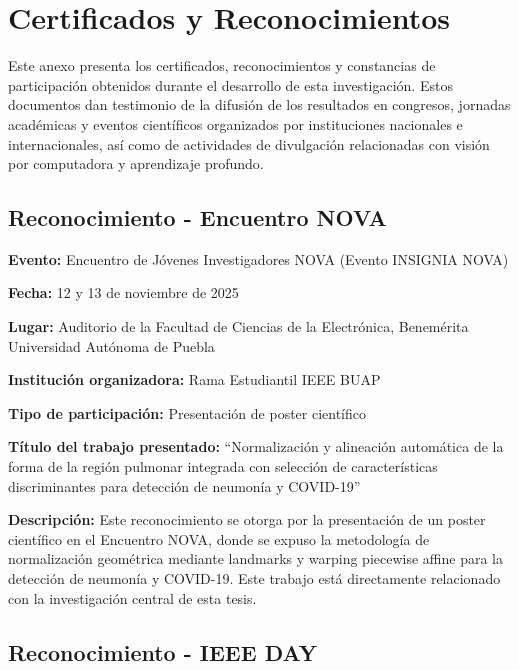 \chapter{Certificados y Reconocimientos}
\label{anexo:certificados}

Este anexo presenta los certificados, reconocimientos y constancias de participación obtenidos durante el desarrollo de esta investigación. Estos documentos dan testimonio de la difusión de los resultados en congresos, jornadas académicas y eventos científicos organizados por instituciones nacionales e internacionales, así como de actividades de divulgación relacionadas con visión por computadora y aprendizaje profundo.

\section{Reconocimiento - Encuentro NOVA}

\textbf{Evento:} Encuentro de Jóvenes Investigadores NOVA (Evento INSIGNIA NOVA)

\textbf{Fecha:} 12 y 13 de noviembre de 2025

\textbf{Lugar:} Auditorio de la Facultad de Ciencias de la Electrónica, Benemérita Universidad Autónoma de Puebla

\textbf{Institución organizadora:} Rama Estudiantil IEEE BUAP

\textbf{Tipo de participación:} Presentación de poster científico

\textbf{Título del trabajo presentado:} ``Normalización y alineación automática de la forma de la región pulmonar integrada con selección de características discriminantes para detección de neumonía y COVID-19''

\textbf{Descripción:} Este reconocimiento se otorga por la presentación de un poster científico en el Encuentro NOVA, donde se expuso la metodología de normalización geométrica mediante landmarks y warping piecewise affine para la detección de neumonía y COVID-19. Este trabajo está directamente relacionado con la investigación central de esta tesis.



\section{Reconocimiento - IEEE DAY}

